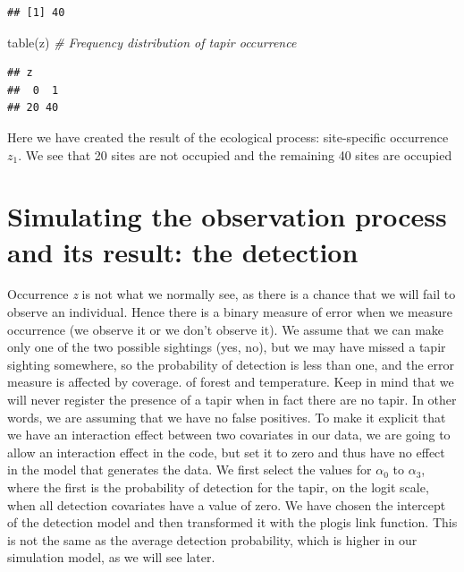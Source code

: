 \documentclass[
]{book}
\newenvironment{Shaded}{\begin{snugshade}}{\end{snugshade}}
\newcommand{\CommentTok}[1]{\textcolor[rgb]{0.56,0.35,0.01}{\textit{#1}}}
\newcommand{\FunctionTok}[1]{\textcolor[rgb]{0.00,0.00,0.00}{#1}}
\newcommand{\NormalTok}[1]{#1}
\begin{document}
\begin{verbatim}
## [1] 40
\end{verbatim}

\begin{Shaded}
\begin{Highlighting}[]
\FunctionTok{table}\NormalTok{(z)                                  }\CommentTok{\# Frequency distribution of tapir occurrence}
\end{Highlighting}
\end{Shaded}

\begin{verbatim}
## z
##  0  1 
## 20 40
\end{verbatim}

Here we have created the result of the ecological process: site-specific occurrence \(z _{1}\). We see that 20 sites are not occupied and the remaining 40 sites are occupied

\hypertarget{simulating-the-observation-process-and-its-result-the-detection}{%
\section{Simulating the observation process and its result: the detection}\label{simulating-the-observation-process-and-its-result-the-detection}}

Occurrence \emph{z} is not what we normally see, as there is a chance that we will fail to observe an individual. Hence there is a binary measure of error when we measure occurrence (we observe it or we don't observe it). We assume that we can make only one of the two possible sightings (yes, no), but we may have missed a tapir sighting somewhere, so the probability of detection is less than one, and the error measure is affected by coverage. of forest and temperature. Keep in mind that we will never register the presence of a tapir when in fact there are no tapir. In other words, we are assuming that we have no false positives. To make it explicit that we have an interaction effect between two covariates in our data, we are going to allow an interaction effect in the code, but set it to zero and thus have no effect in the model that generates the data. We first select the values for \(\alpha _{0}\) to \(\alpha _{3}\), where the first is the probability of detection for the tapir, on the logit scale, when all detection covariates have a value of zero. We have chosen the intercept of the detection model and then transformed it with the plogis link function. This is not the same as the average detection probability, which is higher in our simulation model, as we will see later.
\end{document}
